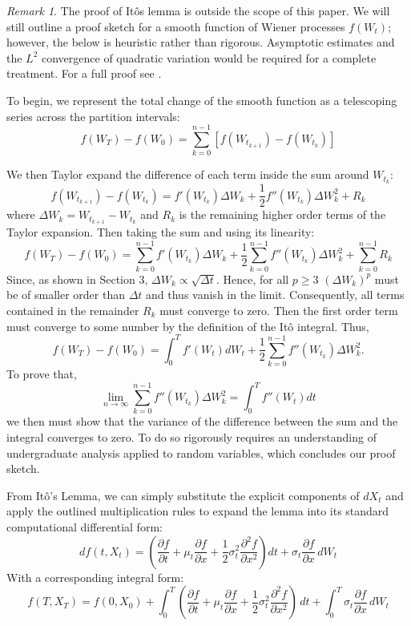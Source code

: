 \documentclass[12pt]{article}
\theoremstyle{definition}
\theoremstyle{plain}
\theoremstyle{remark}
\newtheorem{remark}{Remark}
\begin{document}
\begin{remark}
The proof of It\^os lemma is outside the scope of this paper.  We will still outline a proof sketch for a smooth function of Wiener processes $f(W_t)$; however, the below is heuristic rather than rigorous.  Asymptotic estimates and the $L^2$ convergence of quadratic variation would be required for a complete treatment. For a full proof see \cite{ItoProof}.
\end{remark}

 To begin, we represent the total change of the smooth function as a telescoping series across the partition intervals:
\[
f(W_T) - f(W_0) = \sum_{k=0}^{n-1}[f(W_{t_{k+1}})-f(W_{t_k})]
\]

We then Taylor expand the difference of each term inside the sum around $W_{t_{k}}$:
\[
f(W_{t_{k+1}})-f(W_{t_k}) = f'(W_{t_{k}})\Delta W_k + \frac{1}{2}f''(W_{t_{k}})\Delta W_k^2 + R_k
\]
where $\Delta W_k = W_{t_{k+1}}-W_{t_k}$ and $R_k$ is the remaining higher order terms of the Taylor expansion. Then taking the sum and using its linearity:
\[
f(W_T) - f(W_0) = \sum_{k=0}^{n-1}f'(W_{t_{k}})\Delta W_k + \frac{1}{2}\sum_{k=0}^{n-1}f''(W_{t_{k}})\Delta W_k^2 + \sum_{k=0}^{n-1}R_k
\]
Since, as shown in Section 3, $\Delta W_k \propto \sqrt{\Delta t}$.  Hence, for all $p \geq 3$ $(\Delta W_k)^p$ must be of smaller order than $\Delta t$ and thus vanish in the limit.  Consequently, all terms contained in the remainder $R_k$ must converge to zero.  Then the first order term must converge to some number by the definition of the It\^o integral.  Thus,
\[
f(W_T) - f(W_0) = \int_{0}^{T}f'(W_{t})dW_t + \frac{1}{2}\sum_{k=0}^{n-1}f''(W_{t_{k}})\Delta W_k^2 .
\]
To prove that,
\[
\lim_{n\to\infty}\sum_{k=0}^{n-1}f''(W_{t_{k}})\Delta W_k^2 =\int_0^Tf''(W_t)dt
\]
we then must show that the variance of the difference between the sum and the integral converges to zero.  To do so rigorously requires an understanding of undergraduate analysis applied to random variables, which concludes our proof sketch.

From It\^o's Lemma, we can simply substitute the explicit components of $dX_t$ and apply the outlined multiplication rules to expand the lemma into its standard computational differential form:
\[
df(t, X_t) = \left( \frac{\partial f}{\partial t} + \mu_t \frac{\partial f}{\partial x} + \frac{1}{2} \sigma_t^2 \frac{\partial^2 f}{\partial x^2} \right) dt + \sigma_t \frac{\partial f}{\partial x} \, dW_t
\]
With a corresponding integral form:
\[
f(T,X_T) = f(0,X_0)+\int_0^T\left( \frac{\partial f}{\partial t} + \mu_t \frac{\partial f}{\partial x} + \frac{1}{2} \sigma_t^2 \frac{\partial^2 f}{\partial x^2}\right)\,dt + \int_0^T \sigma_t \frac{\partial f}{\partial x} \, dW_t
\]
\end{document}
